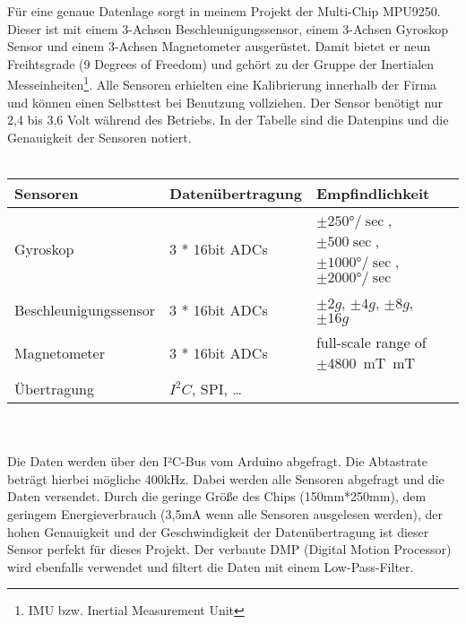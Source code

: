 Für eine genaue Datenlage sorgt in meinem Projekt der Multi-Chip MPU9250. Dieser ist mit 
einem 3-Achsen Beschleunigungssensor, einem 3-Achsen Gyroskop Sensor und einem 3-Achsen 
Magnetometer ausgerüstet. Damit bietet er neun Freihtsgrade (9 Degrees of Freedom) und gehört zu der Gruppe der 
Inertialen Messeinheiten\footnote{IMU bzw. Inertial Measurement Unit}.
Alle Sensoren erhielten eine Kalibrierung innerhalb der 
Firma und können einen Selbsttest bei Benutzung vollziehen. Der Sensor benötigt nur 2,4 bis 3,6 Volt während 
des Betriebs. In der Tabelle sind die Datenpins und die Genauigkeit der Sensoren notiert.\\
\\
\begin{tabularx}{0.8\textwidth}{l|X|XX}
Sensoren & Datenübertragung & Empfindlichkeit                                     \\
\hline
Gyroskop & 3 * 16bit ADCs & $\pm250°/\sec$, $\pm500\sec$, $\pm1000°/\sec$, $\pm2000°/\sec$\\ 
\hline
Beschleunigungssensor & 3 * 16bit ADCs & $\pm2g$, $\pm4g$, $\pm8g$, $\pm16g$\\
\hline
Magnetometer & 3 * 16bit ADCs & full-scale range of $\pm$\SI{4800}{\milli\tesla\meter}T \\
\hline
Übertragung & $I^2C$, SPI, \dots & \\
\end{tabularx}
\\
\\
Die Daten werden über den I²C-Bus vom Arduino abgefragt. Die Abtastrate beträgt hierbei 
mögliche 400kHz. Dabei werden alle Sensoren abgefragt und die Daten versendet.
Durch die geringe Größe des Chips (150mm*250mm), dem geringem Energieverbrauch (3,5mA wenn 
alle Sensoren ausgelesen werden), der hohen Genauigkeit und der Geschwindigkeit der 
Datenübertragung ist dieser Sensor perfekt für dieses Projekt. Der verbaute
DMP (Digital Motion Processor) wird ebenfalls verwendet und filtert die Daten mit einem
Low-Pass-Filter.

